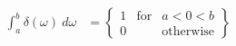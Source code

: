 \documentclass[preview]{standalone}
\begin{document}
\begin{align*}
\int_{a}^{b} \delta(\omega) \ d\omega &=\left\{ \begin{array}{rcl} 1 & \textrm{for} & a<0<b \\ 0 & & \textrm{otherwise} \end{array} \right\}
\end{align*}
\end{document}
